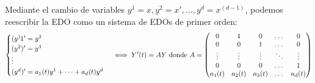 Mediante el cambio de variables $y^1 = x, y^2 = x', \dots, y^d = x^{(d-1)}$, podemos reescribir la EDO como un sistema de EDOs de primer orden:
\[\begin{cases}
		(y^)1' = y^2 \\
		(y^2)' = y^3 \\
		\vdots       \\
		(y^d)' = a_1(t) y^1 + \dots + a_d(t) y^d
	\end{cases} \iff Y'(t) = AY \text{ donde } A= \begin{pmatrix}
		0      & 1      & 0      & \dots  & 0      \\
		0      & 0      & 1      & \dots  & 0      \\
		\vdots & \vdots & \vdots & \ddots & \vdots \\
		0      & 0      & 0      & \dots  & 1      \\
		a_1(t) & a_2(t) & a_3(t) & \dots  & a_d(t)
	\end{pmatrix}\]

